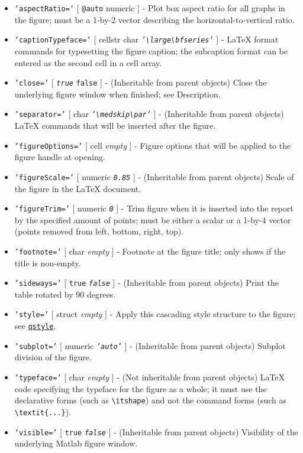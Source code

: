  \begin{itemize}
 \item
   \texttt{'aspectRatio='} {[} \texttt{@auto} \textbar{} numeric {]} -
   Plot box aspect ratio for all graphs in the figure; must be a 1-by-2
   vector describing the horizontal-to-vertical ratio.
 \item
   \texttt{'captionTypeface='} {[} cellstr \textbar{} char \textbar{}
   \emph{\texttt{'\textbackslash{}large\textbackslash{}bfseries'}} {]} -
   LaTeX format commands for typesetting the figure caption; the
   subcaption format can be entered as the second cell in a cell array.
 \item
   \texttt{'close='} {[} \emph{\texttt{true}} \textbar{} \texttt{false}
   {]} - (Inheritable from parent objects) Close the underlying figure
   window when finished; see Description.
 \item
   \texttt{'separator='} {[} char \textbar{}
   \emph{\texttt{'\textbackslash{}medskip\textbackslash{}par'}} {]} -
   (Inheritable from parent objects) LaTeX commands that will be inserted
   after the figure.
 \item
   \texttt{'figureOptions='} {[} cell \textbar{} \emph{empty} {]} -
   Figure options that will be applied to the figure handle at opening.
 \item
   \texttt{'figureScale='} {[} numeric \textbar{} \emph{\texttt{0.85}}
   {]} - (Inheritable from parent objects) Scale of the figure in the
   LaTeX document.
 \item
   \texttt{'figureTrim='} {[} numeric \textbar{} \emph{\texttt{0}} {]} -
   Trim figure when it is inserted into the report by the specified
   amount of points; must be either a scalar or a 1-by-4 vector (points
   removed from left, bottom, right, top).
 \item
   \texttt{'footnote='} {[} char \textbar{} \emph{empty} {]} - Footnote
   at the figure title; only shows if the title is non-empty.
 \item
   \texttt{'sideways='} {[} \texttt{true} \textbar{}
   \emph{\texttt{false}} {]} - (Inheritable from parent objects) Print
   the table rotated by 90 degrees.
 \item
   \texttt{'style='} {[} struct \textbar{} \emph{empty} {]} - Apply this
   cascading style structure to the figure; see
   \href{qreport/qstyle}{\texttt{qstyle}}.
 \item
   \texttt{'subplot='} {[} numeric \textbar{} \emph{\texttt{'auto'}} {]}
   - (Inheritable from parent objects) Subplot division of the figure.
 \item
   \texttt{'typeface='} {[} char \textbar{} \emph{empty} {]} - (Not
   inheritable from parent objects) LaTeX code specifying the typeface
   for the figure as a whole; it must use the declarative forms (such as
   \texttt{\textbackslash{}itshape}) and not the command forms (such as
   \texttt{\textbackslash{}textit\{...\}}).
 \item
   \texttt{'visible='} {[} \texttt{true} \textbar{} \emph{\texttt{false}}
   {]} - (Inheritable from parent objects) Visibility of the underlying
   Matlab figure window.
 \end{itemize}
 

